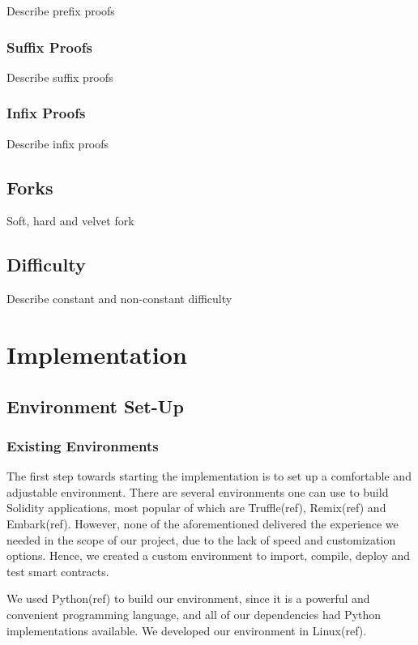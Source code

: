 \documentclass{article}
\begin{document}
  Describe prefix proofs

  \subsubsection{Suffix Proofs}

  Describe suffix proofs

  \subsubsection{Infix Proofs}

  Describe infix proofs

  \subsection{Forks}

  Soft, hard and velvet fork

  \subsection{Difficulty}

  Describe constant and non-constant difficulty

  \pagebreak

  \section{Implementation}

  \subsection{Environment Set-Up}

  \subsubsection{Existing Environments}

  The first step towards starting the implementation is to set up a
  comfortable and adjustable environment. There are several environments
  one can use to build Solidity applications, most popular of which are
  Truffle(ref), Remix(ref) and Embark(ref). However, none of the
  aforementioned delivered the experience we needed in the scope of our
  project, due to the lack of speed and customization options. Hence, we
  created a custom environment to import, compile, deploy and test smart
  contracts.

  We used Python(ref) to build our environment, since it is a powerful
  and convenient programming language, and all of our dependencies had
  Python implementations available. We developed our environment in
  Linux(ref).
\end{document}
